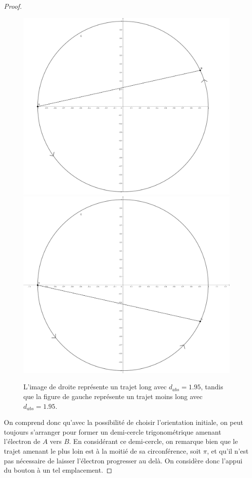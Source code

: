 \documentclass[a4paper]{amsart}
\theoremstyle{definition}
\theoremstyle{remark}
\numberwithin{equation}{section}
\begin{document}
\begin{proof}
  \begin{figure}[H]
    \centering
    \includegraphics[scale=0.079]{images/ab_circle1.png}
    \includegraphics[scale=0.079]{images/ab_circle2.png}
    \caption{L'image de droite représente un trajet long avec $d_{abs}=1.95$, tandis que la figure de gauche représente un trajet moins long avec $d_{abs}=1.95$.}
  \end{figure}

  On comprend donc qu'avec la possibilité de choisir l'orientation initiale, on peut toujours s'arranger pour former un demi-cercle trigonométrique amenant l'électron de $A$ vers $B$. En considérant ce demi-cercle, on remarque bien que le trajet
  amenant le plus loin est à la moitié de sa circonférence, soit $\pi$, et qu'il n'est pas nécessaire de laisser l'électron progresser au delà. On considère donc l'appui du bouton à un tel emplacement.


\end{proof}
\end{document}
